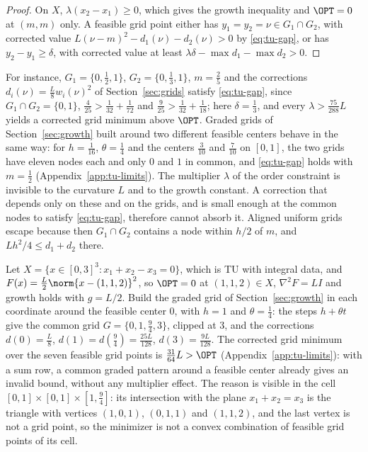 \begin{proof}
On $X$, $\lambda(x_2-x_1)\ge0$, which gives the growth inequality and
$\OPT=0$ at $(m,m)$ only. A feasible grid point either has $y_1=y_2=\nu\in
G_1\cap G_2$, with corrected value $L(\nu-m)^2-d_1(\nu)-d_2(\nu)>0$ by
\eqref{eq:tu-gap}, or has $y_2-y_1\ge\delta$, with corrected value at least
$\lambda\delta-\max d_1-\max d_2>0$.
\end{proof}

For instance, $G_1=\{0,\frac12,1\}$, $G_2=\{0,\frac13,1\}$, $m=\frac25$ and the
corrections $d_i(\nu)=\frac L8w_i(\nu)^2$ of Section~\ref{sec:grids} satisfy
\eqref{eq:tu-gap}, since $G_1\cap G_2=\{0,1\}$,
$\frac4{25}>\frac1{32}+\frac1{72}$ and $\frac9{25}>\frac1{32}+\frac1{18}$; here
$\delta=\frac13$, and every $\lambda>\frac{75}{288}L$ yields a corrected grid
minimum above $\OPT$. Graded grids of Section~\ref{sec:growth} built around
two different feasible centers behave in the same way: for $h=\frac1{16}$,
$\theta=\frac14$ and the centers $\frac3{10}$ and $\frac7{10}$ on $[0,1]$, the
two grids have eleven nodes each and only $0$ and $1$ in common, and
\eqref{eq:tu-gap} holds with $m=\frac12$ (Appendix~\ref{app:tu-limits}). The
multiplier $\lambda$ of the order constraint is invisible to the curvature
$L$ and to the growth constant. A correction that depends only on these and
on the grids, and is small enough at the common nodes to satisfy
\eqref{eq:tu-gap}, therefore cannot absorb it. Aligned uniform grids escape
because then $G_1\cap G_2$ contains a node within $h/2$ of $m$, and
$Lh^2/4\le d_1+d_2$ there.

\begin{example}\label{ex:tu-sum}
Let $X=\{x\in[0,3]^3:x_1+x_2-x_3=0\}$, which is TU with integral data, and
$F(x)=\frac L2\norm{x-(1,1,2)}^2$, so $\OPT=0$ at $(1,1,2)\in X$,
$\nabla^2F=LI$ and growth holds with $g=L/2$. Build the graded grid of
Section~\ref{sec:growth} in each coordinate around the feasible center $0$,
with $h=1$ and $\theta=\frac14$: the steps $h+\theta t$ give the common grid
$G=\{0,1,\frac94,3\}$, clipped at $3$, and the corrections
$d(0)=\frac L8$, $d(1)=d(\frac94)=\frac{25L}{128}$, $d(3)=\frac{9L}{128}$. The
corrected grid minimum over the seven feasible grid points is
$\frac{31}{64}L>\OPT$ (Appendix~\ref{app:tu-limits}): with a sum row, a common
graded pattern around a feasible center already gives an invalid bound,
without any multiplier effect. The reason is visible in the cell
$[0,1]\times[0,1]\times[1,\frac94]$: its intersection with the plane
$x_1+x_2=x_3$ is the triangle with vertices $(1,0,1)$, $(0,1,1)$ and
$(1,1,2)$, and the last vertex is not a grid point, so the minimizer is not a
convex combination of feasible grid points of its cell.
\end{example}

